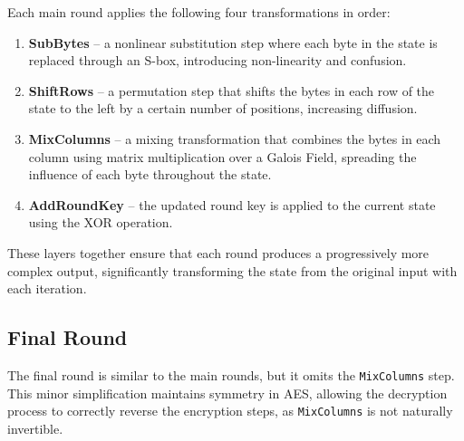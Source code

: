 Each main round applies the following four transformations in order:

\begin{enumerate}
    \item \textbf{SubBytes} – a nonlinear substitution step where each byte in the state is replaced through an S-box, 
    introducing non-linearity and confusion.
    \item \textbf{ShiftRows} – a permutation step that shifts the bytes in each 
    row of the state to the left by a certain number of positions, increasing diffusion.
    \item \textbf{MixColumns} – a mixing transformation that combines the bytes in each column using 
    matrix multiplication over a Galois Field, spreading the influence of each byte throughout the state.
    \item \textbf{AddRoundKey} – the updated round key is applied to the current state using the XOR operation.
\end{enumerate}
\noindent
These layers together ensure that each round produces a progressively more complex output, 
significantly transforming the state from the original input with each iteration.

\subsection{Final Round}
\noindent
The final round is similar to the main rounds, but it omits the \texttt{MixColumns} step. 
This minor simplification maintains symmetry in AES, 
allowing the decryption process to correctly reverse the encryption steps, 
as \texttt{MixColumns} is not naturally invertible.